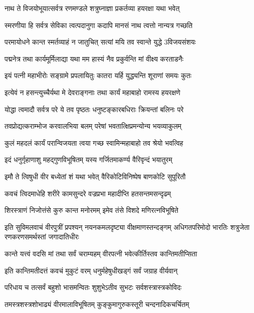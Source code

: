 \twolineshloka
{नाथ ते विजयोभूयात्सर्वत्र रणमण्डले}
{शत्रुघ्नाज्ञा प्रकर्तव्या हयरक्षा यथा भवेत्}%

\twolineshloka
{स्मरणीया हि सर्वत्र सेविका त्वत्पदानुगा}
{कदापि मानसं नाथ त्वत्तो नान्यत्र गच्छति}%

\twolineshloka
{परमायोधने कान्त स्मर्तव्याहं न जातुचित्}
{सत्यां मयि तव स्वान्ते युद्धे 3विजयसंशयः}%

\twolineshloka
{पद्मनेत्र तथा कार्यमूर्मिलाद्या यथा मम}
{हास्यं नैव प्रकुर्वन्ति मां वीक्ष्य करताडनैः}%

\twolineshloka
{इयं पत्नी महाभीरोः सङ्ग्रामे प्रपलायितुः}
{कातरा यर्हि युद्ध्यन्ति शूराणां समयः कुतः}%

\twolineshloka
{इत्येवं न हसन्त्युच्चैर्यथा मे देवराङ्गनाः}
{तथा कार्यं महाबाहो रामस्य हयरक्षणे}%

\twolineshloka
{योद्धा त्वमादौ सर्वत्र परे ये तव पृष्ठतः}
{धनुष्टङ्कारबधिराः क्रियन्तां बलिनः परे}%

\twolineshloka
{तवप्रोद्यत्कराम्भोज करवालभिया बलम्}
{परेषां भवतात्क्षिप्रमन्योन्य भयव्याकुलम्}%

\twolineshloka
{कुलं महदलं कार्यं परान्विजयता त्वया}
{गच्छ स्वामिन्महाबाहो तव श्रेयो भवत्विह}%

\twolineshloka
{इदं धनुर्गृहाणाशु महद्गुणविभूषितम्}
{यस्य गर्जितमाकर्ण्य वैरिवृन्दं भयातुरम्}%

\twolineshloka
{इमौ ते त्विषुधी वीर बध्येतां शं यथा भवेत्}
{वैरिकोटिविनिष्पेष बाणकोटि सुपूरितौ}%

\twolineshloka
{कवचं त्विदमाधेहि शरीरे कामसुन्दरे}
{वज्रप्रभा महादीप्ति हतसन्तमसन्दृढम्}%

\twolineshloka
{शिरस्त्राणं निजोत्तंसे कुरु कान्त मनोरमम्}
{इमेव तंसे विशदे मणिरत्नविभूषिते}%

\fourlineindentedshloka
{इति सुविमलवाचं वीरपुत्रीं प्रपश्यन्}
{नयनकमलदृष्ट्या वीक्षमाणस्तन्दङ्गम्}
{अधिगतपरिमोदो भारतिः शत्रुजेता}
{रणकरणसमर्थस्तां जगादातिधीरः}%


\twolineshloka
{कान्ते यत्त्वं वदसि मां तथा सर्वं चराम्यहम्}
{वीरपत्नी भवेत्कीर्तिस्तव कान्तिमतीप्सिता}%

\twolineshloka
{इति कान्तिमतीदत्तं कवचं मुकुटं वरम्}
{धनुर्महेषुधीखड्गं सर्वं जग्राह वीर्यवान्}%

\twolineshloka
{परिधाय च तत्सर्वं बहुशो भासमन्वितः}
{शुशुभेऽतीव सुभटः सर्वशस्त्रास्त्रकोविदः}%

\twolineshloka
{तमस्त्रशस्त्रशोभाढ्यं वीरमालाविभूषितम्}
{कुङ्कुमागुरुकस्तूरी चन्दनादिकचर्चितम्}%

